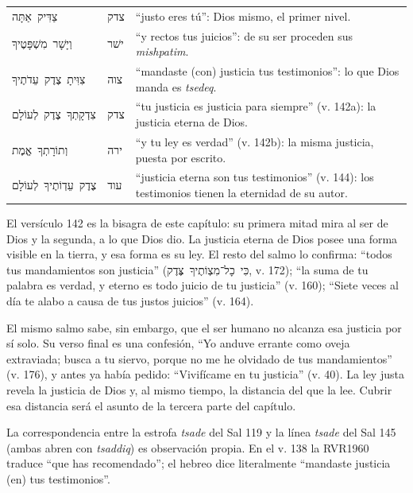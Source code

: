 \documentclass[11pt,letterpaper]{article}
\newcommand{\heb}[1]{\mbox{\foreignlanguage{hebrew}{#1}}}
\begin{document}
\begin{filologia}[Sal 119:137--144]
\begin{tabular}{@{}L{3.2cm}L{1.6cm}L{10cm}@{}}
\heb{צַדִּיק אַתָּה} & \heb{צדק} & ``justo eres tú'': Dios mismo, el primer nivel. \\[2pt]
\heb{וְיָשָׁר מִשְׁפָּטֶיךָ} & \heb{ישׁר} & ``y rectos tus juicios'': de su ser proceden sus \emph{mishpatim}. \\[2pt]
\heb{צִוִּיתָ צֶדֶק עֵדֹתֶיךָ} & \heb{צוה} & ``mandaste (con) justicia tus testimonios'': lo que Dios manda es \emph{tsedeq}. \\[2pt]
\heb{צִדְקָתְךָ צֶדֶק לְעוֹלָם} & \heb{צדק} & ``tu justicia es justicia para siempre'' (v. 142a): la justicia eterna de Dios. \\[2pt]
\heb{וְתוֹרָתְךָ אֱמֶת} & \heb{ירה} & ``y tu ley es verdad'' (v. 142b): la misma justicia, puesta por escrito. \\[2pt]
\heb{צֶדֶק עֵדְוֹתֶיךָ לְעוֹלָם} & \heb{עוד} & ``justicia eterna son tus testimonios'' (v. 144): los testimonios tienen la eternidad de su autor. \\
\end{tabular}
\end{filologia}

El versículo 142 es la bisagra de este capítulo: su primera mitad mira al ser de Dios y la segunda, a lo que Dios dio. La justicia eterna de Dios posee una forma visible en la tierra, y esa forma es su ley. El resto del salmo lo confirma: ``todos tus mandamientos son justicia'' (\heb{כִּי כָל־מִצְוֹתֶיךָ צֶּדֶק}, v. 172); ``la suma de tu palabra es verdad, y eterno es todo juicio de tu justicia'' (v. 160); ``Siete veces al día te alabo a causa de tus justos juicios'' (v. 164).

El mismo salmo sabe, sin embargo, que el ser humano no alcanza esa justicia por sí solo. Su verso final es una confesión, ``Yo anduve errante como oveja extraviada; busca a tu siervo, porque no me he olvidado de tus mandamientos'' (v. 176), y antes ya había pedido: ``Vivifícame en tu justicia'' (v. 40). La ley justa revela la justicia de Dios y, al mismo tiempo, la distancia del que la lee. Cubrir esa distancia será el asunto de la tercera parte del capítulo.

\begin{nota}[Precisión]
La correspondencia entre la estrofa \emph{tsade} del Sal 119 y la línea \emph{tsade} del Sal 145 (ambas abren con \emph{tsaddiq}) es observación propia. En el v. 138 la RVR1960 traduce ``que has recomendado''; el hebreo dice literalmente ``mandaste justicia (en) tus testimonios''.
\end{nota}
\end{document}
